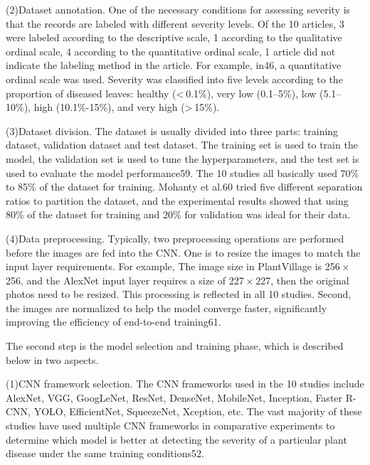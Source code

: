 (2)Dataset annotation. One of the necessary conditions for assessing severity is that the records are labeled with different severity levels. Of the 10 articles, 3 were labeled according to the descriptive scale, 1 according to the qualitative ordinal scale, 4 according to the quantitative ordinal scale, 1 article did not indicate the labeling method in the article. For example, in46, a quantitative ordinal scale was used. Severity was classified into five levels according to the proportion of diseased leaves: healthy (< 0.1\%), very low (0.1–5\%), low (5.1–10\%), high (10.1\%-15\%), and very high (> 15\%).

(3)Dataset division. The dataset is usually divided into three parts: training dataset, validation dataset and test dataset. The training set is used to train the model, the validation set is used to tune the hyperparameters, and the test set is used to evaluate the model performance59. The 10 studies all basically used 70\% to 85\% of the dataset for training. Mohanty et al.60 tried five different separation ratios to partition the dataset, and the experimental results showed that using 80\% of the dataset for training and 20\% for validation was ideal for their data.

(4)Data preprocessing. Typically, two preprocessing operations are performed before the images are fed into the CNN. One is to resize the images to match the input layer requirements. For example, The image size in PlantVillage is 256 × 256, and the AlexNet input layer requires a size of 227 × 227, then the original photos need to be resized. This processing is reflected in all 10 studies. Second, the images are normalized to help the model converge faster, significantly improving the efficiency of end-to-end training61.

The second step is the model selection and training phase, which is described below in two aspects.

(1)CNN framework selection. The CNN frameworks used in the 10 studies include AlexNet, VGG, GoogLeNet, ResNet, DenseNet, MobileNet, Inception, Faster R-CNN, YOLO, EfficientNet, SqueezeNet, Xception, etc. The vast majority of these studies have used multiple CNN frameworks in comparative experiments to determine which model is better at detecting the severity of a particular plant disease under the same training conditions52.

